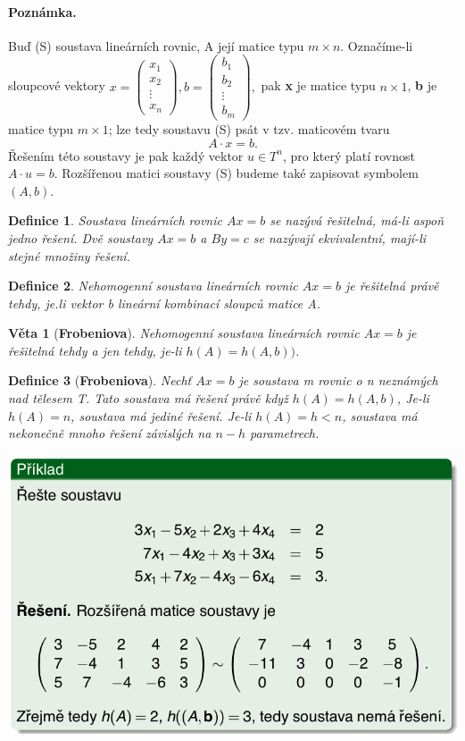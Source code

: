 \documentclass[12pt,a4paper]{article}
\newtheorem{definition}{Definice}
\newtheorem{sentence}{Věta}
\begin{document}
\paragraph{Poznámka.} Buď (S) soustava lineárních rovnic, A její matice typu $m \times n$. Označíme-li sloupcové vektory $x = \left( \begin{array}{c}
							x_1\\
							x_2\\
							\vdots \\
							x_n
						\end{array} \right),
						b = \left( \begin{array}{c}
							b_1\\
							b_2\\
							\vdots \\
							b_m
						\end{array} \right),$
	pak \textbf{x} je matice typu $n \times 1$, \textbf{b} je matice typu $m \times 1$; lze tedy soustavu (S) psát v tzv. maticovém tvaru $$A \cdot x = b.$$ Řešením této soustavy je pak každý vektor $u \in T^n$, pro který platí rovnost $A \cdot u = b$. Rozšířenou matici soustavy (S) budeme také zapisovat symbolem $(A, b)$.
	
\begin{definition}
	Soustava lineárních rovnic $Ax = b$ se nazývá řešitelná, má-li aspoň jedno řešení. Dvě soustavy $Ax = b$ a $By = c$ se nazývají ekvivalentní, mají-li stejné množiny řešení.
\end{definition}

\begin{definition}
	Nehomogenní soustava lineárních rovnic $Ax = b$ je řešitelná právě tehdy, je.li vektor b lineární kombinací sloupců matice A.
\end{definition}
\begin{sentence}[\textbf{Frobeniova}]
	Nehomogenní soustava lineárních rovnic $Ax = b$ je řešitelná tehdy a jen tehdy, je-li $h(A) = h(A, b))$.
\end{sentence}
\begin{definition}[\textbf{Frobeniova}]
	Nechť $Ax = b$ je soustava m rovnic o n neznámých nad tělesem T. Tato soustava má řešení právě když $h(A) = h(A,b)$, Je-li $h(A) = n$, soustava má jediné řešení. Je-li $h(A) = h < n$, soustava má nekonečně mnoho řešení závislých na $n - h$ parametrech.
\end{definition}
\includegraphics[scale=0.5]{img/LinSoust1}
\end{document}
